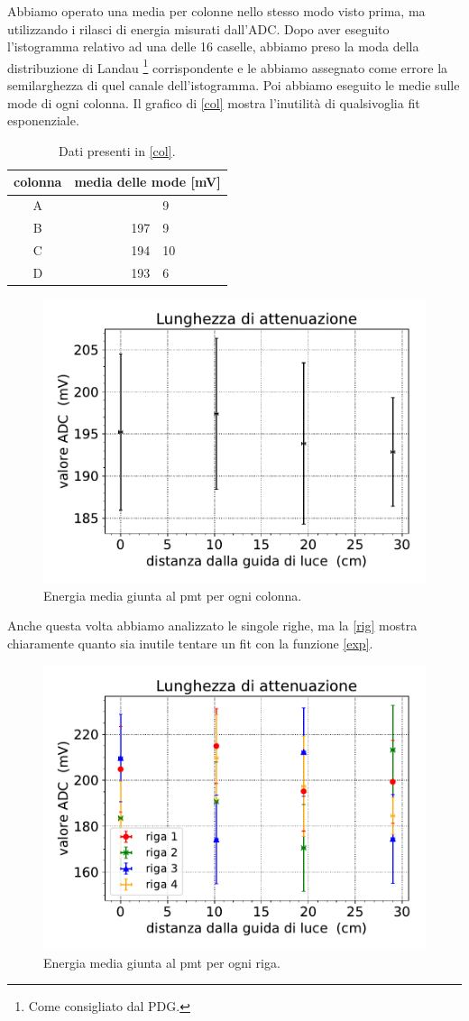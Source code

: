 Abbiamo operato una media per colonne nello stesso modo visto prima, ma utilizzando i rilasci di energia misurati dall'ADC. Dopo aver eseguito l'istogramma relativo ad una delle 16 caselle, abbiamo preso la moda della distribuzione di Landau%
\footnote{Come consigliato dal PDG.}
corrispondente e le abbiamo assegnato come errore la semilarghezza di quel canale dell'istogramma. Poi abbiamo eseguito le medie sulle mode di ogni colonna.
Il grafico di \autoref{col} mostra l'inutilità di qualsivoglia fit esponenziale.

\begin{table}[h]
\centering
\begin{tabular}{| c | r @{$\pm$} l |}
\hline
colonna & \multicolumn{2}{c|}{media delle mode [mV]} \\
\hline
A & \qquad \quad 195&9 \\
B & 197&9 \\
C & 194&10 \\
D & 193&6 \\
\hline
\end{tabular}
\caption{Dati presenti in \autoref{col}.}
\label{tab:ADC}
\end {table}

\begin{figure}[h]
\centering
\includegraphics[width=8 cm]{ecol}
\caption{Energia media giunta al pmt per ogni colonna.}
\label{col}
\end{figure}


Anche questa volta abbiamo analizzato le singole righe, ma la \autoref{rig} mostra chiaramente quanto sia inutile tentare un fit con la funzione \eqref{exp}. 

\begin{figure}[h]
\centering
\includegraphics[width=8 cm]{erig}
\caption{Energia media giunta al pmt per ogni riga.}
\label{rig}
\end{figure}


